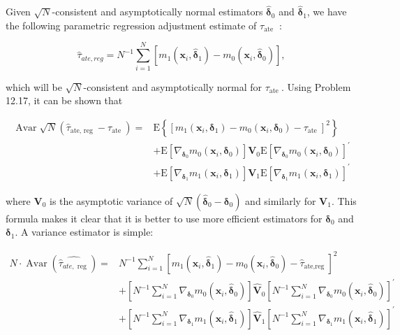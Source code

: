 \documentclass[10pt]{article}
\begin{document}
Given $\sqrt{N}$-consistent and asymptotically normal estimators $\hat{\boldsymbol{\delta}}_{0}$ and $\hat{\boldsymbol{\delta}}_{1}$, we have the following parametric regression adjustment estimate of $\tau_{\text {ate }}$ :


\begin{equation*}
\hat{\tau}_{a t e, r e g}=N^{-1} \sum_{i=1}^{N}\left[m_{1}\left(\mathbf{x}_{i}, \hat{\boldsymbol{\delta}}_{1}\right)-m_{0}\left(\mathbf{x}_{i}, \hat{\boldsymbol{\delta}}_{0}\right)\right], \tag{21.30}
\end{equation*}


which will be $\sqrt{N}$-consistent and asymptotically normal for $\tau_{\text {ate }}$. Using Problem 12.17, it can be shown that

$$
\begin{aligned}
\operatorname{Avar} \sqrt{N}\left(\hat{\tau}_{\text {ate, reg }}-\tau_{\text {ate }}\right)= & \mathrm{E}\left\{\left[m_{1}\left(\mathbf{x}_{i}, \boldsymbol{\delta}_{1}\right)-m_{0}\left(\mathbf{x}_{i}, \boldsymbol{\delta}_{0}\right)-\tau_{\text {ate }}\right]^{2}\right\} \\
& +\mathrm{E}\left[\nabla_{\boldsymbol{\delta}_{0}} m_{0}\left(\mathbf{x}_{i}, \boldsymbol{\delta}_{0}\right)\right] \mathbf{V}_{0} \mathrm{E}\left[\nabla_{\boldsymbol{\delta}_{0}} m_{0}\left(\mathbf{x}_{i}, \boldsymbol{\delta}_{0}\right)\right]^{\prime} \\
& +\mathrm{E}\left[\nabla_{\boldsymbol{\delta}_{1}} m_{1}\left(\mathbf{x}_{i}, \boldsymbol{\delta}_{1}\right)\right] \mathbf{V}_{1} \mathrm{E}\left[\nabla_{\boldsymbol{\delta}_{1}} m_{1}\left(\mathbf{x}_{i}, \boldsymbol{\delta}_{1}\right)\right]^{\prime}
\end{aligned}
$$

where $\mathbf{V}_{0}$ is the asymptotic variance of $\sqrt{N}\left(\hat{\boldsymbol{\delta}}_{0}-\boldsymbol{\delta}_{0}\right)$ and similarly for $\mathbf{V}_{1}$. This formula makes it clear that it is better to use more efficient estimators for $\boldsymbol{\delta}_{0}$ and $\boldsymbol{\delta}_{1}$. A variance estimator is simple:


\begin{align*}
N \cdot \operatorname{Avar}\left(\widehat{\hat{\tau}_{a t e, \text { reg }}}\right)= & N^{-1} \sum_{i=1}^{N}\left[m_{1}\left(\mathbf{x}_{i}, \hat{\boldsymbol{\delta}}_{1}\right)-m_{0}\left(\mathbf{x}_{i}, \hat{\boldsymbol{\delta}}_{0}\right)-\hat{\tau}_{\text {ate,reg }}\right]^{2} \\
& +\left[N^{-1} \sum_{i=1}^{N} \nabla_{\boldsymbol{\delta}_{0}} m_{0}\left(\mathbf{x}_{i}, \hat{\boldsymbol{\delta}}_{0}\right)\right] \hat{\mathbf{V}}_{0}\left[N^{-1} \sum_{i=1}^{N} \nabla_{\boldsymbol{\delta}_{0}} m_{0}\left(\mathbf{x}_{i}, \hat{\boldsymbol{\delta}}_{0}\right)\right]^{\prime} \\
& +\left[N^{-1} \sum_{i=1}^{N} \nabla_{\boldsymbol{\delta}_{1}} m_{1}\left(\mathbf{x}_{i}, \hat{\boldsymbol{\delta}}_{1}\right)\right] \hat{\mathbf{V}}_{1}\left[N^{-1} \sum_{i=1}^{N} \nabla_{\boldsymbol{\delta}_{1}} m_{1}\left(\mathbf{x}_{i}, \hat{\boldsymbol{\delta}}_{1}\right)\right]^{\prime} \tag{21.31}
\end{align*}
\end{document}
